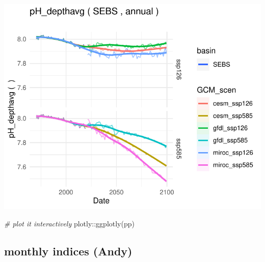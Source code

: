 \documentclass[
]{article}
\newenvironment{Shaded}{\begin{snugshade}}{\end{snugshade}}
\newcommand{\CommentTok}[1]{\textcolor[rgb]{0.56,0.35,0.01}{\textit{#1}}}
\newcommand{\FunctionTok}[1]{\textcolor[rgb]{0.00,0.00,0.00}{#1}}
\newcommand{\NormalTok}[1]{#1}
\newcommand{\SpecialCharTok}[1]{\textcolor[rgb]{0.00,0.00,0.00}{#1}}
\begin{document}
\begin{center}\includegraphics{ACLIM2_quickStart_files/figure-latex/unnamed-chunk-7-2} \end{center}

\begin{Shaded}
\begin{Highlighting}[]
\CommentTok{\# plot it interactively}
\NormalTok{plotly}\SpecialCharTok{::}\FunctionTok{ggplotly}\NormalTok{(pp)}
\end{Highlighting}
\end{Shaded}

\hypertarget{monthly-indices-andy}{%
\subsection{monthly indices (Andy)}\label{monthly-indices-andy}}
\end{document}
